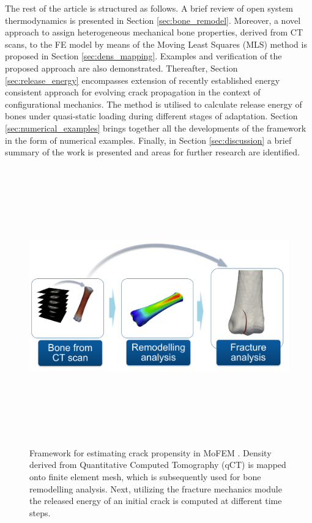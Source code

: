 \documentclass[11pt]{acmeArticle}
\numberwithin{equation}{section}
\begin{document}
The rest of the article is structured as follows.
A brief review of open system thermodynamics is presented in Section \ref{sec:bone_remodel}.
Moreover, a novel approach to assign heterogeneous mechanical bone properties, derived from CT scans,
to the FE model by means of the Moving Least Squares (MLS) method is proposed in Section \ref{sec:dens_mapping}.
Examples and verification of the proposed approach are also demonstrated. 
Thereafter, Section \ref{sec:release_energy} encompasses extension of recently established energy consistent approach 
for evolving crack propagation in the context of configurational mechanics. 
The method is utilised to calculate release energy of bones under quasi-static loading during different stages of adaptation. 
Section \ref{sec:numerical_examples} brings together all the developments of the framework in the form of numerical examples. 
Finally, in Section \ref{sec:discussion} a brief summary of the work is presented and areas for further research are identified.
\begin{figure}[h!]
\begin{center}
\includegraphics[width=12cm,height=12cm]{Figures/framework.png}
\caption{Framework for estimating crack propensity in MoFEM \citep{mofem2017}. Density derived from Quantitative Computed Tomography (qCT) is mapped onto finite element mesh, which is subsequently used for bone remodelling analysis. Next, utilizing the fracture mechanics module the released energy of an initial crack is computed at different time steps.}
\label{fig:scales}
\end{center}
\end{figure}
\end{document}
